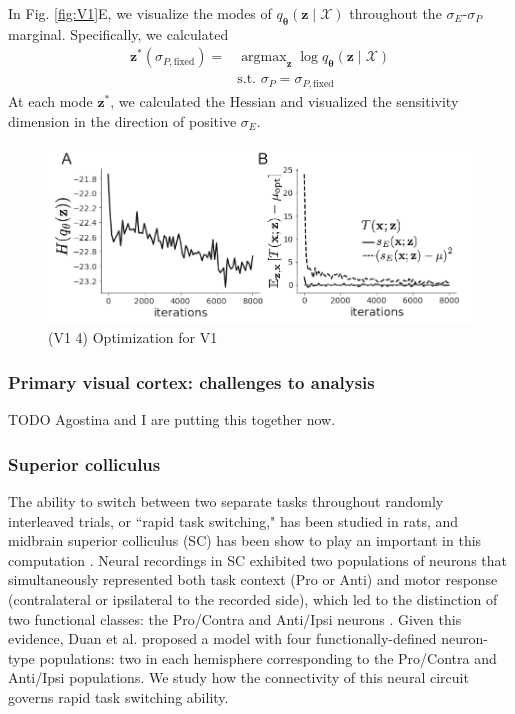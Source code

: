\documentclass[11pt]{article}
\DeclareMathOperator*{\argmax}{argmax}
\begin{document}
In Fig. \ref{fig:V1}E, we visualize the modes of $q_{\bm{\theta}}(\mathbf{z} \mid \mathcal{X})$ throughout the $\sigma_E$-$\sigma_P$ marginal.
Specifically, we calculated
\begin{equation}
\begin{split}
\mathbf{z}^*(\sigma_{P,\text{fixed}}) = &\argmax_{\mathbf{z}} \log q_{\bm{\theta}}(\mathbf{z} \mid \mathcal{X}) \\
&\text{s.t. } \sigma_P = \sigma_{P,\text{fixed}}\
\end{split}
\end{equation}
At each mode $\mathbf{z}^*$, we calculated the Hessian and visualized the sensitivity dimension in the direction of positive $\sigma_E$.

\begin{figure}[h]
\caption{\small (V1 4)
Optimization for V1
 }
 \label{fig:V1_4}
\begin{center}
\includegraphics[scale=.8]{figures/figV1_4/figV1_4.pdf}
\end{center}
\end{figure}

\subsubsection{Primary visual cortex: challenges to analysis}\label{methods_V1_complexity}
TODO Agostina and I are putting this together now.

\subsubsection{Superior colliculus}\label{methods_SC}
The ability to switch between two separate tasks throughout randomly interleaved trials, or ``rapid task switching," has been studied in rats, and midbrain superior colliculus (SC) has been show to play an important in this computation \cite{duan2015requirement}.
Neural recordings in SC exhibited two populations of neurons that simultaneously represented both task context (Pro or Anti) and motor response (contralateral or ipsilateral to the recorded side), which led to the distinction of two functional classes: the Pro/Contra and Anti/Ipsi neurons \cite{duan2018collicular}.
Given this evidence, Duan et al. proposed a model with four functionally-defined neuron-type populations: two in each hemisphere corresponding to the Pro/Contra and Anti/Ipsi populations.  
We study how the connectivity of this neural circuit governs rapid task switching ability.
\end{document}
